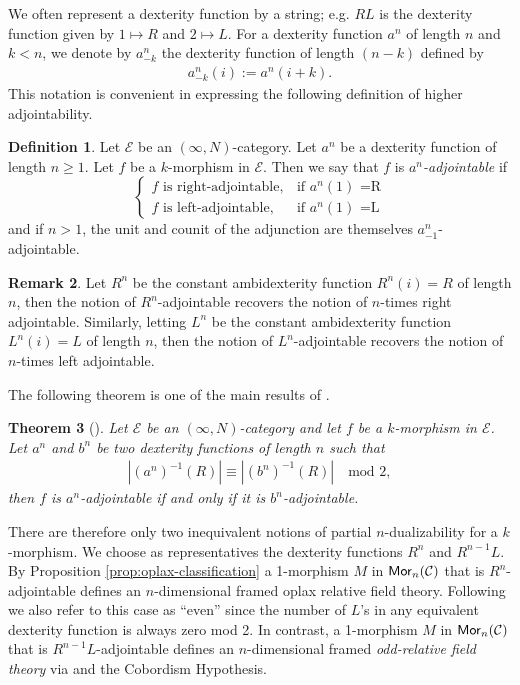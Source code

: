 \documentclass[10pt, reqno, twoside
, final
]{amsart}
\numberwithin{equation}{subsection}%
\theoremstyle{definition}
\newtheorem{defn}{Definition}[subsection]
\theoremstyle{definition}
\theoremstyle{definition}
\theoremstyle{definition}
\theoremstyle{definition}
\theoremstyle{definition}
\theoremstyle{definition}
\theoremstyle{definition}
\theoremstyle{definition}
\theoremstyle{plain}
\newtheorem{thm}[defn]{Theorem}
\theoremstyle{definition}
\theoremstyle{plain}
\theoremstyle{definition}
\theoremstyle{plain}
\theoremstyle{definition}
\newtheorem{rmk}[defn]{Remark}
\theoremstyle{definition}
\theoremstyle{plain}
\theoremstyle{plain}
\theoremstyle{definition}
\theoremstyle{plain}
\theoremstyle{plain}
\theoremstyle{plain}
\begin{document}
We often represent a dexterity function by a string; e.g. $RL$ is the dexterity function given by $1\mapsto R$ and $2\mapsto L$. For a dexterity function $a^n$ of length $n$ and $k< n$, we denote by $a^{n}_{-k}$ the dexterity function of length $(n-k)$ defined by
\begin{align*}
    a^{n}_{-k}(i) := a^n(i+k).
\end{align*}
This notation is convenient in expressing the following definition of higher adjointability.

\begin{defn}\label{def:n-times-adj}
Let $\mathcal{E}$ be an $(\infty,N)$-category. Let $a^n$ be a dexterity function of length $n \geq 1$. Let $f$ be a $k$-morphism in $\mathcal{E}$. Then we say that $f$ is \textit{$a^n$-adjointable} if
\begin{equation*}
    \begin{cases} \text{$f$ is right-adjointable},  &\text{if $a^n(1)$ =R}  \\
     \text{$f$ is left-adjointable},  &\text{if $a^n(1)$ =L} 
    \end{cases}
\end{equation*}
and if $n>1$, the unit and counit of the adjunction are themselves $a^{n}_{-1}$-adjointable.
\end{defn}

\begin{rmk}
Let $R^n$ be the constant ambidexterity function $R^n(i) = R$ of length $n$, then the notion of $R^n$-adjointable recovers the notion of $n$-times right adjointable. Similarly, letting $L^n$ be the constant ambidexterity function $L^n(i) = L$ of length $n$, then the notion of $L^n$-adjointable recovers the notion of $n$-times left adjointable.
\end{rmk}

The following theorem is one of the main results of \cite{SS25}.

\begin{thm}[\cite{SS25}]\label{lem:even-even}
Let $\mathcal{E}$ be an $(\infty,N)$-category and let $f$ be a $k$-morphism in $\mathcal{E}$. Let $a^n$ and $b^n$ be two dexterity functions of length $n$ such that
\begin{align*}
    |(a^n)^{-1}(R)| \equiv |(b^n)^{-1}(R)| \quad \text{mod 2},
\end{align*}then $f$ is $a^n$-adjointable if and only if it is $b^n$-adjointable.
\end{thm}

There are therefore only two inequivalent notions of partial $n$-dualizability for a $k$-morphism. We choose as representatives the dexterity functions $R^n$ and $R^{n-1}L$. By Proposition \ref{prop:oplax-classification} a 1-morphism $M$ in $\mathsf{Mor}_n(\mathcal{C})$ that is $R^n$-adjointable defines an $n$-dimensional framed oplax relative field theory. Following \cite{SS25} we also refer to this case as ``even'' since the number of $L$'s in any equivalent dexterity function is always zero mod 2. In contrast, a 1-morphism $M$ in $\mathsf{Mor}_n(\mathcal{C})$ that is $R^{n-1}L$-adjointable defines an $n$-dimensional framed \emph{odd-relative field theory} via \cite{SS25} and the Cobordism Hypothesis.
\end{document}
